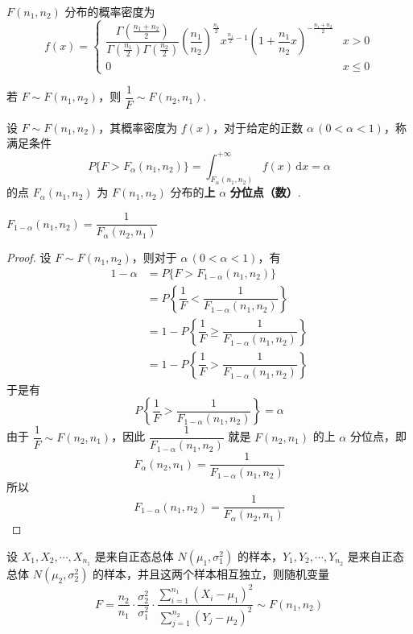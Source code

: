 $F(n_1, n_2)$ 分布的概率密度为
$$
f(x) = \begin{cases}
    \dfrac{\Gamma(\frac{n_1 + n_2}{2})}{\Gamma(\frac{n_1}{2}) \Gamma(\frac{n_2}{2})} \left( \dfrac{n_1}{n_2} \right)^{\frac{n_1}{2}} x^{\frac{n_1}{2} - 1} \left( 1 + \dfrac{n_1}{n_2} x \right)^{-\frac{n_1 + n_2}{2}} & x>0 \\[0.5em]
    0 & x \leqslant 0
\end{cases}
$$

若 $F \sim F(n_1, n_2)$，则 $\dfrac{1}{F} \sim F(n_2, n_1)$.

\begin{definition}
    设 $F \sim F(n_1, n_2)$，其概率密度为 $f(x)$，对于给定的正数 $\alpha \, (0 < \alpha < 1)$，称满足条件
    $$
    P \{ F > F_{\alpha}(n_1, n_2) \} = \int_{F_{\alpha}(n_1, n_2)}^{+\infty} f(x) \, \text{d}x = \alpha
    $$
    的点 $F_{\alpha}(n_1, n_2)$ 为 $F(n_1, n_2)$ 分布的\textbf{上} $\alpha$ \textbf{分位点（数）}.
\end{definition}

\begin{property}
    $F_{1 - \alpha}(n_1, n_2) = \dfrac{1}{F_{\alpha}(n_2, n_1)}$
\end{property}

\begin{proof}
    设 $F \sim F(n_1, n_2)$，则对于 $\alpha \, (0 < \alpha < 1)$，有
    $$
    \begin{aligned}
        1 - \alpha &= P \{ F > F_{1 - \alpha}(n_1, n_2) \} \\
        &= P \left\{ \dfrac{1}{F} < \dfrac{1}{F_{1 - \alpha}(n_1, n_2)} \right\} \\
        &= 1 - P \left\{ \dfrac{1}{F} \geqslant \dfrac{1}{F_{1 - \alpha}(n_1, n_2)} \right\} \\
        &= 1 - P \left\{ \dfrac{1}{F} > \dfrac{1}{F_{1 - \alpha}(n_1, n_2)} \right\}
    \end{aligned}
    $$
    于是有
    $$
    P \left\{ \dfrac{1}{F} > \dfrac{1}{F_{1 - \alpha}(n_1, n_2)} \right\} = \alpha
    $$
    由于 $\dfrac{1}{F} \sim F(n_2, n_1)$，因此 $\dfrac{1}{F_{1 - \alpha}(n_1, n_2)}$ 就是 $F(n_2, n_1)$ 的上 $\alpha$ 分位点，即
    $$
    F_{\alpha}(n_2, n_1) = \dfrac{1}{F_{1 - \alpha}(n_1, n_2)}
    $$
    所以
    $$
    F_{1 - \alpha}(n_1, n_2) = \dfrac{1}{F_{\alpha}(n_2, n_1)}
    $$
\end{proof}

\begin{theorem}
    设 $X_1, X_2, \cdots, X_{n_1}$ 是来自正态总体 $N(\mu_1, \sigma_1^2)$ 的样本，$Y_1, Y_2, \cdots, Y_{n_2}$ 是来自正态总体 $N(\mu_2, \sigma_2^2)$ 的样本，并且这两个样本相互独立，则随机变量
    $$
    F = \dfrac{n_2}{n_1} \cdot \dfrac{\sigma_2^2}{\sigma_1^2} \cdot \dfrac{\displaystyle\sum_{i=1}^{n_1} (X_i - \mu_1)^2}{\displaystyle\sum_{j=1}^{n_2} (Y_j - \mu_2)^2} \sim F(n_1, n_2)
    $$
\end{theorem}

